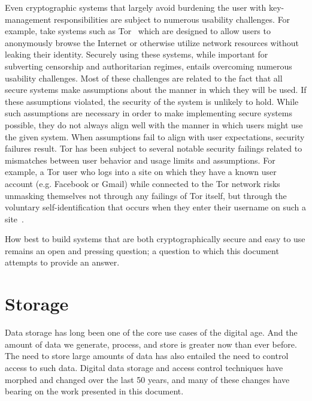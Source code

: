 Even cryptographic systems that largely avoid burdening the user with
key-management responsibilities are subject to numerous usability
challenges. For example, take systems such as
Tor~\cite{dingledine2004} which are designed to allow users to
anonymously browse the Internet or otherwise utilize network resources
without leaking their identity. Securely using these systems, while
important for subverting censorship and authoritarian regimes, entails
overcoming numerous usability challenges. Most of these challenges are
related to the fact that all secure systems make assumptions about the
manner in which they will be used. If these assumptions violated, the
security of the system is unlikely to hold. While such assumptions are
necessary in order to make implementing secure systems possible, they
do not always align well with the manner in which users might use the
given system. When assumptions fail to align with user expectations,
security failures result. Tor has been subject to several notable
security failings related to mismatches between user behavior and
usage limits and assumptions. For example, a Tor user who logs into a
site on which they have a known user account (e.g. Facebook or Gmail)
while connected to the Tor network risks unmasking themselves not
through any failings of Tor itself, but through the voluntary
self-identification that occurs when they enter their username on such
a site~\cite{goodin-dreadpirate}.

How best to build systems that are both cryptographically secure and
easy to use remains an open and pressing question; a question to which
this document attempts to provide an answer.

\section{Storage}
\label{chap:background:storage}

Data storage has long been one of the core use cases of the digital
age. And the amount of data we generate, process, and store is greater
now than ever before. The need to store large amounts of data has also
entailed the need to control access to such data. Digital data storage
and access control techniques have morphed and changed over the last
50 years, and many of these changes have bearing on the work presented
in this document.

